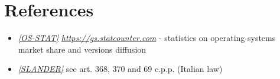 \documentclass[a4paper]{report}
\begin{document}
\chapter{References}
\begin{itemize}

\item \label{ref:os-stats} \hyperref[use:os-stats]{\textit{[OS-STAT]}} \href{https://gs.statcounter.com}{\textit{https://gs.statcounter.com}} - statistics on operating systems market share and versions diffusion

\item \label{ref:slander} \hyperref[use:slander]{\textit{[SLANDER]}} see art. 368, 370 and 69 c.p.p. (Italian law)

\end{itemize}
\end{document}
